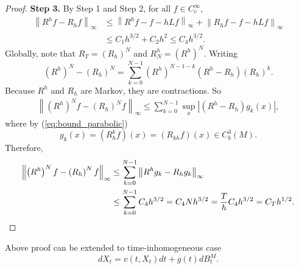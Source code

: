 \begin{proof}
    \vspace{0.5em}
    \textbf{Step 3.} By Step 1 and Step 2, for all $f \in C_c^\infty$,
    \begin{align*}
        \left\|R^h f-R_h f\right\|_{\infty} & \leq\left\|R^h f-f-h L f\right\|_{\infty}+\left\|R_h f-f-h L f\right\|_{\infty} \\
        & \leq C_1 h^{3/2}+C_2 h^2 \leq C_4h^{3/2}.
    \end{align*}
    Globally, note that $R_T = (R_h)^N$ and $R^h_N = (R^h)^N$. Writing
    \begin{equation*}
        \left(R^h\right)^N-\left(R_h\right)^N=\sum_{k=0}^{N-1}\left(R^h\right)^{N-1-k}\left(R^h-R_h\right)\left(R_h\right)^k .
    \end{equation*}
    Because $R^h$ and $R_h$ are Markov, they are contractions. So
    \begin{align*}
        \left\|\left(R^h\right)^N f-\left(R_h\right)^N f\right\|_{\infty} \leq \sum_{k=0}^{N-1} \sup _x\left|\left(R^h-R_h\right)g_k(x)\right|,
    \end{align*}
    where by (\ref{eq:bound_parabolic})
    \begin{equation*}
        g_k(x) = \left(R_h^k f\right)(x) = \left(R_{kh} f\right)(x) \in C_b^3(M).
    \end{equation*}
    Therefore,
    \begin{align*}
        \left\|\left(R^h\right)^N f-\left(R_h\right)^N f\right\|_{\infty} &\leq \sum_{k=0}^{N-1} \left\|R^h g_k-R_h g_k\right\|_{\infty} \\
        &\leq \sum_{k=0}^{N-1} C_4h^{3/2} = C_4Nh^{3/2} = \frac{T}{h}C_4h^{3/2} = C_Th^{1/2}. \qedhere
    \end{align*}
\end{proof}
\begin{rmk}
    Above proof can be extended to time-inhomogeneous case
    \begin{equation*}
        dX_t = v(t,X_t)dt + g(t)dB^M_t.
    \end{equation*} 
\end{rmk}

